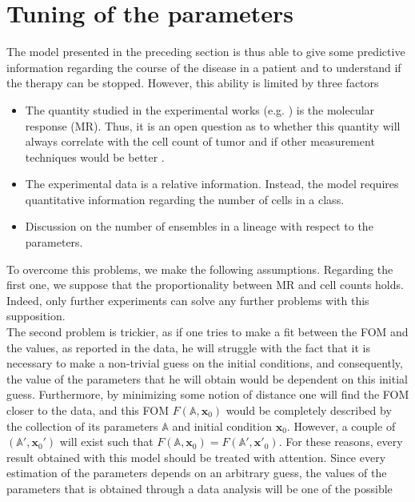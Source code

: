 \documentclass[a4paper,10pt]{article}
\begin{document}
\section{Tuning of the parameters}
The model presented in the preceding section is thus able to give some predictive 
information regarding the course of the disease in a patient and to 
understand if the therapy can be stopped.
However, this ability is limited by three factors 
\begin{itemize}
\item The quantity studied in the experimental works (e.g. \cite{michor2005, olshen2014dynamics}) 
is the molecular response (MR). 
Thus, it is an open question as to whether this quantity will always correlate with the 
cell count of tumor and if other 
measurement techniques would be better 
\cite{rainero2018gdna, experiment-affidabile-1, experiment-affidabile-2, experiment-affidabile-3,
experiment-affidabile-4, latham2016bcr}.
\item The experimental data is a relative 
information.
Instead, the model requires
quantitative information 
regarding the number of cells in a class.
\item Discussion on the number of ensembles in a lineage with respect to the parameters. 
\end{itemize}
To overcome this problems, we make the following assumptions.
Regarding the first one, we suppose that the proportionality between MR and cell counts holds.
Indeed, only further experiments can solve any further problems with this supposition.\\
The second problem is trickier, 
as if one tries to make a fit 
between the FOM and the values,
as reported in the data, he will struggle with the fact that it is necessary to make
a non-trivial guess 
on the initial conditions, 
and consequently, the value of the parameters that he will obtain would be dependent on 
this initial guess. 
Furthermore, by minimizing some notion of distance 
one will find the FOM closer to the data, and this 
FOM $F(\mathbb{A},\mathbf{x}_0)$ 
would be completely described by the collection of its parameters 
$\mathbb{A}$ and initial condition $\mathbf{x}_0$.
However, a couple of
$(\mathbb{A}',\mathbf{x}_0')$ will exist such that
$F(\mathbb{A},\mathbf{x}_0)=F(\mathbb{A}',\mathbf{x}'_0)$.
For these reasons, every result obtained with this model 
should be treated with attention. Since every estimation of the parameters
depends on an arbitrary guess, the values of the parameters that is
obtained through a data analysis will be one of the possible
\end{document}
